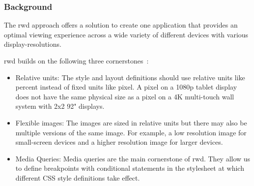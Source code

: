 \documentclass{sigchi}
\begin{document}
\subsubsection{Background}
The \gls{rwd} \cite{Marcotte:2011} approach offers a solution to create one application that provides an optimal viewing experience across a wide variety of different devices with various display-resolutions. 

\gls{rwd} builds on the following three cornerstones~\cite{Marcotte:2011}:
\begin{itemize}
	\item Relative units: The style and layout definitions should use relative units like percent instead of fixed units like pixel. 
	A pixel on a 1080p tablet display does not have the same physical size as a pixel on a 4K multi-touch wall system with 2x2 92" displays. 
	
	\item Flexible images: The images are sized in relative units but there may also be multiple versions of the same image. 
	For example, a low resolution image for small-screen devices and a higher resolution image for larger devices.
	
	\item Media Queries: Media queries are the main cornerstone of \gls{rwd}. 
	They allow us to define breakpoints with conditional statements in the stylesheet at which different CSS style definitions take effect.
\end{itemize}
\end{document}
